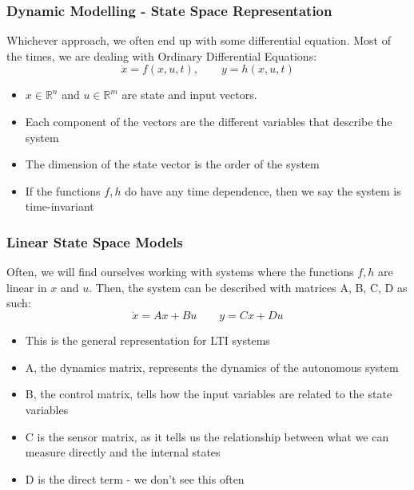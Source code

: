 \documentclass{beamer}
\begin{document}
\begin{frame}
\frametitle{Dynamic Modelling - State Space Representation}
Whichever approach, we often end up with some differential equation.
Most of the times, we are dealing with Ordinary Differential Equations:
\begin{equation}
    \dot{x} = f(x, u, t), \qquad y = h(x, u, t)
\end{equation}

\begin{itemize}
    \item $x \in \mathbb{R}^n$ and $u \in \mathbb{R}^m$ are state and input vectors. 
    \item Each component of the vectors are the different variables that describe the system
    \item The dimension of the state vector is the order of the system
    \item If the functions $f, h$ do have any time dependence, then we say the system is time-invariant
\end{itemize}

\end{frame}

\begin{frame}
\frametitle{Linear State Space Models}
Often, we will find ourselves working with systems where the functions $f,h$ are linear in $x$ and $u$.
Then, the system can be described with matrices A, B, C, D as such: 
\begin{equation}
    \dot{x} = A x + Bu \qquad y = Cx + Du
\end{equation}
\begin{itemize}
    \item This is the general representation for LTI systems
    \item A, the dynamics matrix, represents the dynamics of the autonomous system
    \item B, the control matrix, tells how the input variables are related to the state variables
    \item C is the sensor matrix, as it tells us the relationship between what we can measure directly and the internal states
    \item D is the direct term -  we don't see this often
\end{itemize}
\end{frame}
\end{document}
